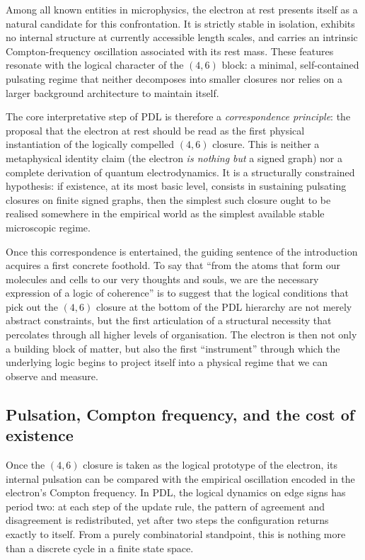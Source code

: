 \documentclass[11pt,a4paper]{article}
\theoremstyle{definition}
\begin{document}
Among all known entities in microphysics, the electron at rest presents itself as a natural candidate for this confrontation. It is strictly stable in isolation, exhibits no internal structure at currently accessible length scales, and carries an intrinsic Compton-frequency oscillation associated with its rest mass.\cite{Laubscher_EmergencePhysicalReality_2024,Laubscher_Existence_PulsatingClosure_2026} These features resonate with the logical character of the \((4,6)\) block: a minimal, self-contained pulsating regime that neither decomposes into smaller closures nor relies on a larger background architecture to maintain itself.

The core interpretative step of PDL is therefore a \emph{correspondence principle}: the proposal that the electron at rest should be read as the first physical instantiation of the logically compelled \((4,6)\) closure.\cite{Laubscher_EmergencePhysicalReality_2024,Laubscher_PDL_Position_2024} This is neither a metaphysical identity claim (the electron \emph{is nothing but} a signed graph) nor a complete derivation of quantum electrodynamics. It is a structurally constrained hypothesis: if existence, at its most basic level, consists in sustaining pulsating closures on finite signed graphs, then the simplest such closure ought to be realised somewhere in the empirical world as the simplest available stable microscopic regime.

Once this correspondence is entertained, the guiding sentence of the introduction acquires a first concrete foothold. To say that ``from the atoms that form our molecules and cells to our very thoughts and souls, we are the necessary expression of a logic of coherence'' is to suggest that the logical conditions that pick out the \((4,6)\) closure at the bottom of the PDL hierarchy are not merely abstract constraints, but the first articulation of a structural necessity that percolates through all higher levels of organisation. The electron is then not only a building block of matter, but also the first ``instrument'' through which the underlying logic begins to project itself into a physical regime that we can observe and measure.\cite{Laubscher_Existence_PulsatingClosure_2026,Laubscher_PDL_GlobalMapping_v6_2024}

\subsection{Pulsation, Compton frequency, and the cost of existence}

Once the \((4,6)\) closure is taken as the logical prototype of the electron, its internal pulsation can be compared with the empirical oscillation encoded in the electron’s Compton frequency.\cite{Laubscher_EmergencePhysicalReality_2024,Laubscher_Schrodinger_Compat_v2_2024} In PDL, the logical dynamics on edge signs has period two: at each step of the update rule, the pattern of agreement and disagreement is redistributed, yet after two steps the configuration returns exactly to itself.\cite{Laubscher_MinimalClosures_46_2024} From a purely combinatorial standpoint, this is nothing more than a discrete cycle in a finite state space.
\end{document}
